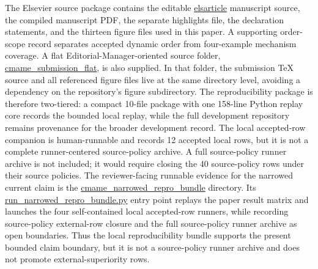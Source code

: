 \documentclass[preprint,12pt]{elsarticle}
\providecommand{\nolinkurl}[1]{\url{#1}}
\begin{document}
The Elsevier source package contains the editable \nolinkurl{elsarticle}
manuscript source, the compiled manuscript PDF, the separate highlights file,
the declaration statements, and the thirteen figure files used in this paper.
A supporting order-scope record separates accepted dynamic order from
four-example mechanism coverage. A flat Editorial-Manager-oriented source
folder, \nolinkurl{cmame_submission_flat}, is also supplied. In that folder,
the submission TeX source and all referenced figure files live at the same
directory level, avoiding a dependency on the repository's figure
subdirectory.
The reproducibility package is therefore two-tiered: a compact 10-file
package with one 158-line Python replay core records the bounded local replay,
while the full development repository remains provenance for the broader
development record. The local accepted-row companion is human-runnable and
records 12 accepted local rows, but it is not a complete runner-centered
source-policy archive. A full source-policy runner archive is not included;
it would require closing the 40 source-policy rows under their source
policies.
The reviewer-facing runnable evidence for the narrowed current claim is the
\nolinkurl{cmame_narrowed_repro_bundle} directory. Its
\nolinkurl{run_narrowed_repro_bundle.py} entry point replays the paper result
matrix and launches the four self-contained local accepted-row runners, while
recording source-policy external-row closure and the full source-policy
runner archive as open boundaries. Thus the local reproducibility bundle
supports the present bounded claim boundary, but it is not a source-policy
runner archive and does not promote external-superiority rows.
\end{document}
